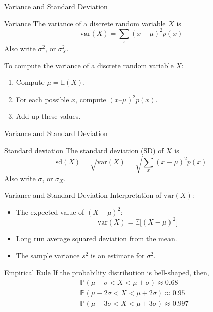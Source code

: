 \documentclass{beamer}
\newcommand{\ignore}[1]{}
\newcommand{\pr}{\mathbb{P}}
\newcommand{\E}{\mathbb{E}}
\newcommand{\Var}{\text{var}}
\newcommand{\SD}{\text{sd}}
\begin{document}
\begin{frame}{Variance and Standard Deviation}
\begin{block}{Variance}
The variance of a discrete random variable $X$ is 
$$ \Var(X) = \sum_x (x-\mu)^2 p(x) $$
Also write $\sigma^2$, or $\sigma_X^2$.
\end{block}

To compute the variance of a discrete random variable $X$:
\begin{enumerate}
\item Compute $\mu=\E(X)$.
\item For each possible $x$, compute $(x – \mu)^2 p(x)$.
\item Add up these values.
\end{enumerate}

\ignore{
\vspace{\stretch{0.5}}
The standard deviation of $X$ is $\SD(X)=\sqrt{\Var(X)}$. Also write $\sigma$, or $\sigma_X$.
}
\end{frame}


\begin{frame}{Variance and Standard Deviation}
\begin{block}{Standard deviation}
The standard deviation (SD) of $X$ is 
$$\SD(X)=\sqrt{\Var(X)} = \sqrt{\sum_x (x-\mu)^2 p(x) }$$ 
Also write $\sigma$, or $\sigma_X$.
\end{block}
\end{frame}

\begin{frame}{Variance and Standard Deviation}
Interpretation of $\Var(X)$:
\begin{itemize}
\item The expected value of $(X-\mu)^2$: $$\Var(X)=\E\Big[(X-\mu)^2\Big]$$
\item Long run average squared deviation from the mean.
\item The sample variance $s^2$ is an estimate for $\sigma^2$.
\end{itemize}
\end{frame}


\begin{frame}{Empirical Rule}
If the probability distribution is bell-shaped, then,
\begin{align*}
& \pr(\mu -\sigma  <X< \mu + \sigma)  \approx 0.68 \\
& \pr(\mu -2\sigma <X< \mu +2\sigma)  \approx 0.95 \\
& \pr(\mu -3\sigma <X< \mu +3\sigma)  \approx 0.997
\end{align*}
\end{frame}
\end{document}
